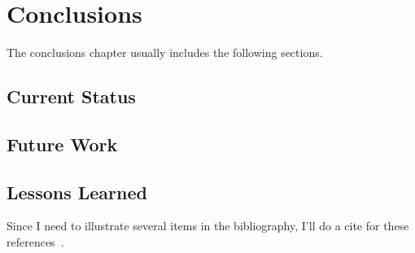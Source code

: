 \chapter{Conclusions}


The conclusions chapter usually includes the following sections.



\section{Current Status}

\section{Future Work}

\section{Lessons Learned}


Since I need to illustrate several items in the bibliography, I'll do a cite 
for these references~\cite{Bayliss2008-sigcse,Dumont2007-robots,
ELmasri06-text,Ericson07-sigcse,Silberschatz05-text}. 
